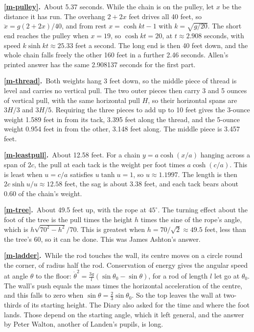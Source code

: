 \documentclass[11pt,a4paper]{article}
\newcommand{\ans}[2]{\par\smallskip\noindent\textbf{\ref{#1}.}\ #2}
\begin{document}
\ans{m-pulley}{About 5.37 seconds. While the chain is on the pulley, let $x$ be the
distance it has run. The overhang $2 + 2x$ feet drives all 40 feet, so
$\ddot x = g(2+2x)/40$, and from rest $x = \cosh kt - 1$ with $k = \sqrt{g/20}$. The
short end reaches the pulley when $x = 19$, so $\cosh kt = 20$, at $t\approx2.908$
seconds, with speed $k\sinh kt\approx25.33$ feet a second. The long end is then 40 feet
down, and the whole chain falls freely the other 160 feet in a further 2.46 seconds.
Allen's printed answer has the same 2.908137 seconds for the first part.}

\ans{m-thread}{Both weights hang 3 feet down, so the middle piece of thread is level and
carries no vertical pull. The two outer pieces then carry 3 and 5 ounces of vertical
pull, with the same horizontal pull $H$, so their horizontal spans are $3H/3$ and $3H/5$.
Requiring the three pieces to add up to 10 feet gives the 3-ounce weight 1.589 feet in
from its tack, 3.395 feet along the thread, and the 5-ounce weight 0.954 feet in from the
other, 3.148 feet along. The middle piece is 3.457 feet.}

\ans{m-leastpull}{About 12.58 feet. For a chain $y = a\cosh(x/a)$ hanging across a span
of $2c$, the pull at each tack is the weight per foot times $a\cosh(c/a)$. This is least
when $u = c/a$ satisfies $u\tanh u = 1$, so $u\approx1.1997$. The length is then
$2c\sinh u/u\approx12.58$ feet, the sag is about 3.38 feet, and each tack bears about 0.60
of the chain's weight.}

\ans{m-tree}{About 49.5 feet up, with the rope at $45^\circ$. The turning effect about the
foot of the tree is the pull times the height $h$ times the sine of the rope's angle,
which is $h\sqrt{70^2 - h^2}/70$. This is greatest when $h = 70/\sqrt2\approx49.5$ feet,
less than the tree's 60, so it can be done. This was James Ashton's answer.}

\ans{m-ladder}{While the rod touches the wall, its centre moves on a circle round the
corner, of radius half the rod. Conservation of energy gives the angular speed at angle
$\theta$ to the floor: $\dot\theta^2 = \tfrac{3g}{l}(\sin\theta_0 - \sin\theta)$, for a
rod of length $l$ let go at $\theta_0$. The wall's push equals the mass times the
horizontal acceleration of the centre, and this falls to zero when
$\sin\theta = \tfrac23\sin\theta_0$. So the top leaves the wall at two-thirds of its
starting height. The Diary also asked for the time and where the foot lands. Those depend
on the starting angle, which it left general, and the answer by Peter Walton, another of
Landen's pupils, is long.}
\end{document}
